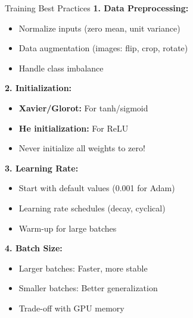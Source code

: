 \documentclass[aspectratio=169]{beamer}
\begin{document}
\begin{frame}{Training Best Practices}
  \textbf{1. Data Preprocessing:}
  \begin{itemize}
    \item Normalize inputs (zero mean, unit variance)
    \item Data augmentation (images: flip, crop, rotate)
    \item Handle class imbalance
  \end{itemize}

  \textbf{2. Initialization:}
  \begin{itemize}
    \item \textbf{Xavier/Glorot:} For tanh/sigmoid
    \item \textbf{He initialization:} For ReLU
    \item Never initialize all weights to zero!
  \end{itemize}

  \textbf{3. Learning Rate:}
  \begin{itemize}
    \item Start with default values (0.001 for Adam)
    \item Learning rate schedules (decay, cyclical)
    \item Warm-up for large batches
  \end{itemize}

  \textbf{4. Batch Size:}
  \begin{itemize}
    \item Larger batches: Faster, more stable
    \item Smaller batches: Better generalization
    \item Trade-off with GPU memory
  \end{itemize}
\end{frame}
\end{document}
